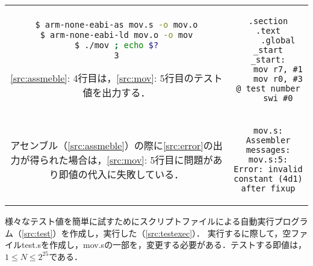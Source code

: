 \begin{tabular}[c]{cc}
    \begin{minipage}[t]{0.45\textwidth}
        \centering
        \begin{lstlisting}[caption={アセンブル},label={src:assmeble},language={Bash},frame={left}]
$ arm-none-eabi-as mov.s -o mov.o
$ arm-none-eabi-ld mov.o -o mov
$ ./mov ; echo $?
3
    \end{lstlisting}
        \begin{flushleft}
            \ref{src:assmeble}: 4行目は，\ref{src:mov}: 5行目のテスト値を出力する．
        \end{flushleft}
    \end{minipage} &
    \begin{minipage}[t]{0.45\textwidth}
        \centering
        \begin{lstlisting}[caption={{\ttfamily mov.s}},label={src:mov},frame={left}]
    .section    .text
    .global     _start
_start:
    mov r7, #1
    mov r0, #3 @ test number
    swi #0
\end{lstlisting}
    \end{minipage}
    \vspace{0.5em}                                                                          \\
    \begin{minipage}[c]{0.45\textwidth}
        アセンブル（\ref{src:assmeble}）の際に\ref{src:error}の出力が得られた場合は，\ref{src:mov}: 5行目に問題があり即値の代入に失敗している．
    \end{minipage}
    \hspace{1em}                                                                          &
    \begin{minipage}[c]{0.45\textwidth}
        \begin{lstlisting}[numbers={none},caption={Error出力},label={src:error},frame={single}]
mov.s: Assembler messages:
mov.s:5: Error: invalid constant (4d1) after fixup
    \end{lstlisting}
    \end{minipage}
\end{tabular}
様々なテスト値を簡単に試すためにスクリプトファイルによる自動実行プログラム（\ref{src:test}）を作成し，実行した（\ref{src:testexec}）．
実行するに際して，空ファイル{\ttfamily test.s}を作成し，{\ttfamily mov.s}の一部を，変更する必要がある．テストする即値は，\(1\leq N\leq 2^{25}\)である．
